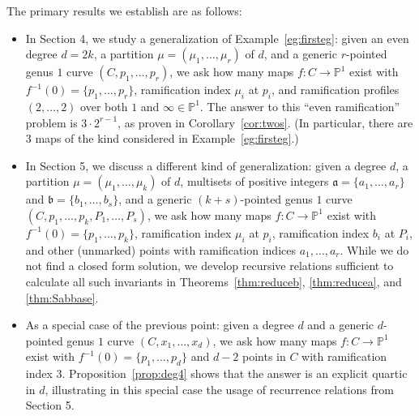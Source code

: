 \documentclass[thesis]{thesis-umich}           %
\renewcommand{\a}{\mathfrak a}
\renewcommand{\b}{\mathfrak b}
\renewcommand{\P}{\mathbb P}
\theoremstyle{definition}
\begin{document}
The primary results we establish are as follows:
\begin{itemize}
\item In Section 4, we study a generalization of Example~\ref{eg:firsteg}: given
  an even degree $d=2k$, a partition $\mu=(\mu_1,\dots,\mu_r)$ of $d$, and a generic
  $r$-pointed genus $1$ curve $(C,p_1,\dots,p_r)$, we ask how many maps
  $f:C\to\P^1$ exist with $f^{-1}(0)=\{p_1,\dots,p_r\}$, ramification index $\mu_i$
  at $p_i$, and ramification profiles $(2,\dots,2)$ over both $1$ and $\infty\in\P^1$.
  The answer to this ``even ramification'' problem is $3\cdot 2^{r-1}$, as
  proven in Corollary~\ref{cor:twos}. (In particular, there are $3$ maps of
  the kind considered in Example~\ref{eg:firsteg}.)
\item In Section 5, we discuss a different kind of generalization: given
  a degree $d$, a partition $\mu=(\mu_1,\dots,\mu_k)$ of $d$, multisets of positive integers $\a=\{a_1,\dots,a_r\}$ and $\b=\{b_1,\dots,b_s\}$,
  and a generic $(k+s)$-pointed genus $1$ curve $(C,p_1,\dots,p_k,P_1,\dots,P_s)$,
  we ask how many maps $f:C\to\P^1$ exist with $f^{-1}(0)=\{p_1,\dots,p_k\}$, ramification
  index $\mu_i$ at $p_i$, ramification index $b_i$ at $P_i$, and other (unmarked) points
  with ramification indices $a_1,\dots,a_r$.
  While we do not find a closed form solution, we develop recursive relations sufficient
  to calculate all such invariants in Theorems~\ref{thm:reduceb}, \ref{thm:reducea}, and \ref{thm:Sabbase}.
\item As a special case of the previous point: given a degree $d$ and a generic $d$-pointed genus $1$ curve $(C,x_1,\dots,x_d)$, we ask
  how many maps $f:C\to\P^1$ exist with $f^{-1}(0)=\{p_1,\dots,p_d\}$ and $d-2$ points in $C$ with ramification index $3$. Proposition~\ref{prop:deg4} shows that the answer is an explicit quartic in $d$, illustrating in this special case the usage of recurrence relations from Section 5.
  
  \end{itemize}
\end{document}

